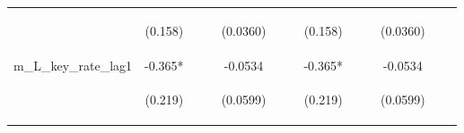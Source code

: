 \documentclass[]{article}
\begin{document}
\begin{center}
\begin{tabular}{lcccccccccccc}
\vspace{4pt} & \begin{footnotesize}(0.158)\end{footnotesize} & \begin{footnotesize}\end{footnotesize} & \begin{footnotesize}\end{footnotesize} & \begin{footnotesize}(0.0360)\end{footnotesize} & \begin{footnotesize}\end{footnotesize} & \begin{footnotesize}\end{footnotesize} & \begin{footnotesize}(0.158)\end{footnotesize} & \begin{footnotesize}\end{footnotesize} & \begin{footnotesize}\end{footnotesize} & \begin{footnotesize}(0.0360)\end{footnotesize} & \begin{footnotesize}\end{footnotesize} & \begin{footnotesize}\end{footnotesize} \\
m\_L\_key\_rate\_lag1 & -0.365* &  &  & -0.0534 &  &  & -0.365* &  &  & -0.0534 &  &  \\
\vspace{4pt} & \begin{footnotesize}(0.219)\end{footnotesize} & \begin{footnotesize}\end{footnotesize} & \begin{footnotesize}\end{footnotesize} & \begin{footnotesize}(0.0599)\end{footnotesize} & \begin{footnotesize}\end{footnotesize} & \begin{footnotesize}\end{footnotesize} & \begin{footnotesize}(0.219)\end{footnotesize} & \begin{footnotesize}\end{footnotesize} & \begin{footnotesize}\end{footnotesize} & \begin{footnotesize}(0.0599)\end{footnotesize} & \begin{footnotesize}\end{footnotesize} & \begin{footnotesize}\end{footnotesize} \\

\end{tabular}
\end{center}
\end{document}

